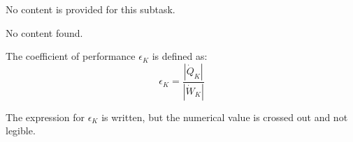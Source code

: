 No content is provided for this subtask.

No content found.

The coefficient of performance \( \epsilon_K \) is defined as:  
\[
\epsilon_K = \frac{|\dot{Q}_K|}{|\dot{W}_K|}
\]  

The expression for \( \epsilon_K \) is written, but the numerical value is crossed out and not legible.